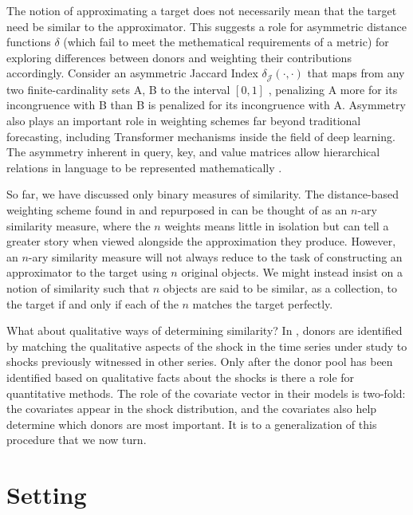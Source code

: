\documentclass[11pt]{article}
\theoremstyle{definition}
\begin{document}
The notion of approximating a target does not necessarily mean that the target need be similar to the approximator.  This suggests a role for asymmetric distance functions $\delta$ (which fail to meet the methematical requirements of a metric) for exploring differences between donors and weighting their contributions accordingly.  Consider an asymmetric Jaccard Index $\delta_{\mathcal{J}}(\cdot,\cdot)$ that maps from any two finite-cardinality sets A, B to the interval $[0,1]$ \citep{garg2015asymmetric}, penalizing A more for its incongruence with B than B is penalized for its incongruence with A.  Asymmetry also plays an important role in weighting schemes far beyond traditional forecasting, including Transformer mechanisms inside the field of deep learning.  The asymmetry inherent in query, key, and value matrices allow hierarchical relations in language to be represented mathematically \citep[p. 364]{bishop2023deep}.  

So far, we have discussed only binary measures of similarity.  The distance-based weighting scheme found in \cite{lin2021minimizing} and repurposed in \cite{lundquist2024volatility} can be thought of as an $n$-ary similarity measure, where the $n$ weights means little in isolation but can tell a greater story when viewed alongside the approximation they produce.  However, an $n$-ary similarity measure will not always reduce to the task of constructing an approximator to the target using $n$ original objects.  We might instead insist on a notion of similarity such that $n$ objects are said to be similar, as a collection, to the target if and only if each of the $n$ matches the target perfectly.

What about qualitative ways of determining similarity?  In \cite{lin2021minimizing, lundquist2024volatility}, donors are identified by matching the qualitative aspects of the shock in the time series under study to shocks previously witnessed in other series.  Only after the donor pool has been identified based on qualitative facts about the shocks is there a role for quantitative methods.  The role of the covariate vector in their models is two-fold: the covariates appear in the shock distribution, and the covariates also help determine which donors are most important.  It is to a generalization of this procedure that we now turn.

\section{Setting}\label{Setting}
\end{document}
